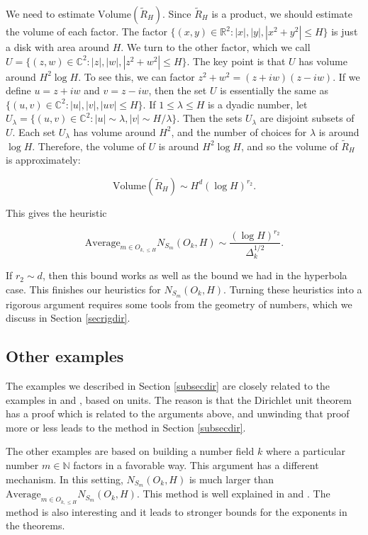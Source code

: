 \documentclass{amsart}
\newcommand{\CC}{\mathbb{C}}
\newcommand{\RR}{\mathbb{R}}
\newcommand{\NN}{\mathbb{N}}
\newcommand{\Average}{\textrm{Average}}
\newcommand{\Volume}{\textrm{Volume}}
\begin{document}
We need to estimate $\Volume(\tilde R_H)$.  Since $\tilde R_H$ is a product,  we should estimate the volume of each factor.  
The factor $ \{ (x,y) \in \RR^2: |x|, |y|, |x^2 + y^2| \le H \}$ is just a disk with area around $H$.   We turn to the other factor,  which we call $U =  \{ (z,w) \in \CC^2: |z|, |w|,  |z^2 + w^2| \le H \} $.   The key point is that $U$ has volume around $H^2 \log H$.   To see this,  we can factor $z^2 + w^2 = (z + iw) (z - i w)$.   If we define $u = z+iw$ and $v = z - iw$,  then the set $U$ is essentially the same as $\{ (u,v) \in \CC^2: |u|, |v|, |uv| \le H \}$.   If $1 \le \lambda \le H$ is a dyadic number,  let $U_{\lambda} = \{ (u,v) \in \CC^2: |u| \sim \lambda, |v| \sim H/ \lambda \}$.   Then the sets $U_\lambda$ are disjoint subsets of $U$.   Each set $U_\lambda$ has volume around $H^2$,  and the number of choices for $\lambda$ is around $\log H$.   Therefore,  the volume of $U$ is around $H^2 \log H$,  and so the volume of $\tilde R_H$ is approximately:

$$ \Volume(\tilde R_H) \sim H^d (\log H)^{r_2}. $$

This gives the heuristic

$$ \Average_{m \in O_{k, \le H} } N_{S_m}(O_k,H) \sim \frac{ (\log H)^{r_2} }{\Delta_k^{1/2}}. $$

If $r_2 \sim d$,  then this bound works as well as the bound we had in the hyperbola case.   This finishes our heuristics for $N_{S_m}(O_k, H)$.   Turning these heuristics into a rigorous argument requires some tools from the geometry of numbers,  which we discuss in Section \ref{secrigdir}.  

\subsection{Other examples}

The examples we described in Section \ref{subsecdir} are closely related to the examples in \cite{BSSZ} and \cite{Anth}, based on units.  The reason is that the Dirichlet unit theorem has a proof which is related to the arguments above, and unwinding that proof more or less leads to the method in Section \ref{subsecdir}.

The other examples are based on building a number field $k$ where a particular number $m \in \NN$ factors in a favorable way.  This argument has a different mechanism.  In this setting, $N_{S_m}(O_k, H)$ is much larger than $\Average_{m \in O_{k, \le H} } N_{S_m}(O_k, H)$.  This method is well explained in \cite{Ta} and \cite{ABG+}.  The method is also interesting and it leads to stronger bounds for the exponents in the theorems.
\end{document}
